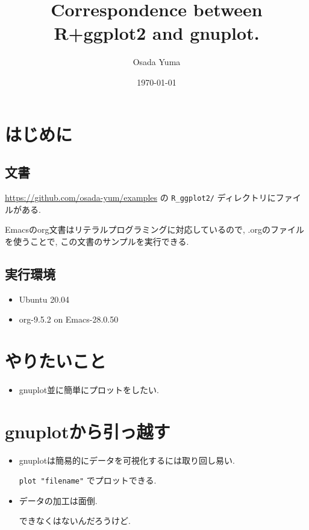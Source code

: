 \documentclass[lualatex,a4paper,12pt,report,ja=standard]{bxjsarticle}
\author{Osada Yuma}
\date{\today}
\title{Correspondence between R+ggplot2 and gnuplot.}
\begin{document}
\maketitle
\tableofcontents

\section{はじめに}
\label{sec:org7836e97}
\subsection{文書}
\label{sec:orgc1d148d}
\url{https://github.com/osada-yum/examples} の \texttt{R\_ggplot2/} ディレクトリにファイルがある.

Emacsのorg文書はリテラルプログラミングに対応しているので, .orgのファイルを使うことで, この文書のサンプルを実行できる.
\subsection{実行環境}
\label{sec:org1d5f73d}
\begin{itemize}
\item Ubuntu 20.04
\item org-9.5.2 on Emacs-28.0.50
\end{itemize}
\section{やりたいこと}
\label{sec:org81f7460}
\begin{itemize}
\item gnuplot並に簡単にプロットをしたい.
\end{itemize}
\section{gnuplotから引っ越す}
\label{sec:orgfad38b7}
\begin{itemize}
\item gnuplotは簡易的にデータを可視化するには取り回し易い.

\texttt{plot "filename"} でプロットできる.
\item データの加工は面倒.

できなくはないんだろうけど.
\end{itemize}
\end{document}
